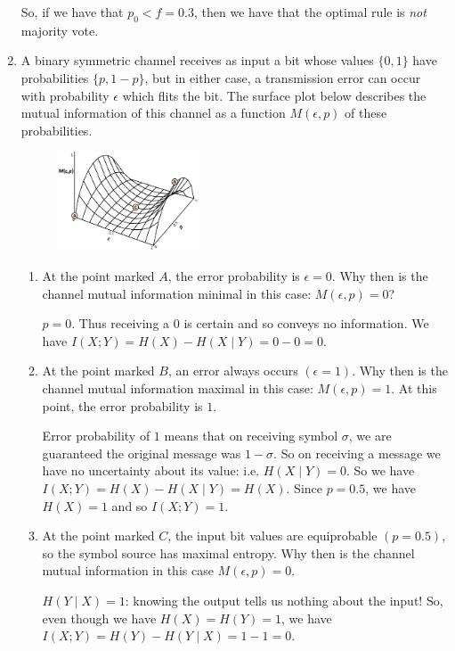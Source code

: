 \documentclass[10pt,\jkfside,a4paper]{article}
\begin{document}
\begin{enumerate}
    So, if we have that $p_0 < f = 0.3$, then we have that the optimal rule is \textit{not} majority vote.

    \item A binary symmetric channel receives as input a bit whose values $\{0, 1\}$ have probabilities $\{p, 1 - p\}$, but in either case, a transmission error can occur with probability $\epsilon$ which flits
    the bit. The surface plot below describes the mutual information of this channel as a function $M(\epsilon, p)$ of these probabilities.

    \begin{figure}[H]

        \centering
        \includegraphics[width=0.4\textwidth]{entropy-plot}

    \end{figure}

    \begin{enumerate}

        \item At the point marked $A$, the error probability is $\epsilon = 0$. Why then is the channel mutual information minimal in this case: $M(\epsilon, p) = 0$?

        $p = 0$. Thus receiving a $0$ is certain and so conveys no information. We have $I(X; Y) = H(X) - H(X \mid Y) = 0 - 0 = 0$.

        \item At the point marked $B$, an error always occurs $(\epsilon = 1)$. Why then is the channel mutual information maximal in this case: $M(\epsilon, p) = 1$. At this point, the error probability is $1$.

        Error probability of $1$ means that on receiving symbol $\sigma$, we are guaranteed the original message was $1 - \sigma$. So on receiving a message we have no uncertainty about its value: i.e.\@
        $H(X \mid Y) = 0$. So we have $I(X; Y) = H(X) - H(X \mid Y) = H(X)$. Since $p = 0.5$, we have $H(X) = 1$ and so $I(X; Y) = 1$.

        \item At the point marked $C$, the input bit values are equiprobable $(p = 0.5)$, so the symbol source has maximal entropy. Why then is the channel mutual information in this case $M(\epsilon, p) = 0$.

        $H(Y \mid X) = 1$: knowing the output tells us nothing about the input! So, even though we have $H(X) = H(Y) = 1$, we have $I(X; Y) = H(Y) - H(Y \mid X) = 1 - 1 = 0$.

    \end{enumerate}

\end{enumerate}
\end{document}

